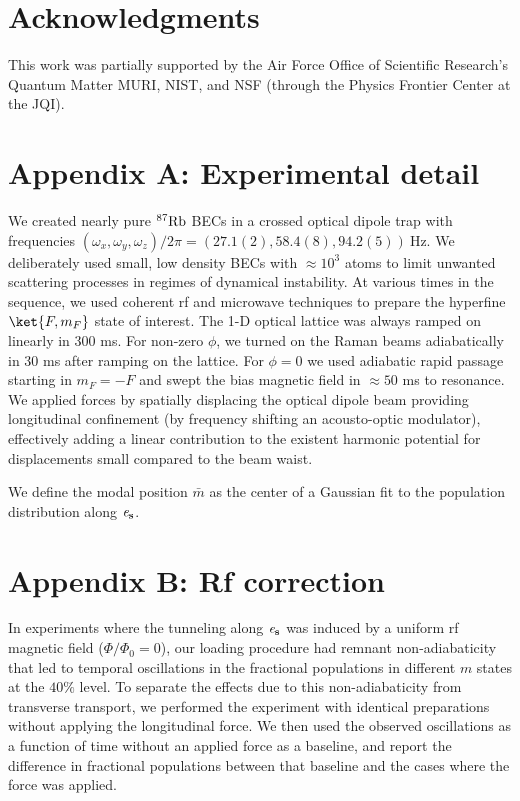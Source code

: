 \section*{Acknowledgments}
This work was partially supported by the Air Force Office of Scientific Research’s Quantum Matter MURI, NIST, and NSF (through the Physics Frontier Center
at the JQI).

\section*{Appendix A: Experimental detail} We created nearly pure $^{87}\rm{Rb}$ BECs in a crossed optical dipole trap\cite{Stuhl2015} with frequencies $(\omega_x,\omega_y,\omega_z)/2\pi=(27.1(2),58.4(8),94.2(5))\ {\mathrm{Hz}}$. We deliberately used small, low density BECs with $\approx10^3$ atoms to limit unwanted scattering processes in regimes of dynamical instability\cite{Campbell2006}. At various times in the sequence, we used coherent rf and microwave techniques to prepare the hyperfine $\ket{F,m_F}$ state of interest. The 1-D optical lattice was always ramped on linearly in 300 ms. For non-zero $\phi$, we turned on the Raman beams adiabatically in 30 ms after ramping on the lattice. For $\phi=0$ we used adiabatic rapid passage starting in $m_F=-F$ and swept the bias magnetic field in $\approx50$ ms to resonance. We applied forces by spatially displacing the optical dipole beam providing longitudinal confinement (by frequency shifting an acousto-optic modulator), effectively adding a linear contribution to the existent harmonic potential for displacements small compared to the beam waist. 

We define the modal position $\bar{m}$ as the center of a Gaussian fit to the population distribution along $\bf{\mathit{e}_s}$. 


\section*{Appendix B: Rf correction} In experiments where the tunneling along $\bf{\mathit{e}_s}$ was induced by a uniform rf magnetic field ($\Phi/\Phi_0=0$), our loading procedure had remnant non-adiabaticity that led to temporal oscillations in the fractional populations in different $m$ states at the $40\%$ level. To separate the effects due to this non-adiabaticity from transverse transport, we performed the experiment with identical preparations without applying the longitudinal force. We then used the observed oscillations as a function of time without an applied force as a baseline, and report the difference in fractional populations between that baseline and the cases where the force was applied. 


